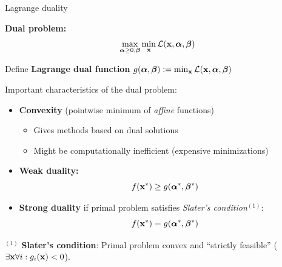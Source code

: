 \documentclass[11pt,compress,t,notes=noshow, xcolor=table]{beamer}
\begin{document}
\begin{vbframe}{Lagrange duality}

\textbf{Dual problem:}
\begin{equation*}
    \max_{\bm{\alpha} \ge 0, \bm{\beta}} \min_{\mathbf{x}}  \mathcal{L}(\mathbf{x}, \bm{\alpha}, \bm{\beta})
\end{equation*}

Define \textbf{Lagrange dual function} $g(\bm{\alpha}, \bm{\beta}) := \min_{\mathbf{x}}  \mathcal{L}(\mathbf{x}, \bm{\alpha}, \bm{\beta})$

\medskip

Important characteristics of the dual problem:

\begin{itemize}
    \item \textbf{Convexity} (pointwise minimum of \textit{affine} functions)
        \begin{itemize}
            \small
            \item Gives methods based on dual solutions
            \item Might be computationally inefficient (expensive minimizations)
        \end{itemize}
    \item \textbf{Weak duality:}
        \begin{equation*}
            f(\mathbf{x}^*) \geq g(\bm{\alpha}^*, \bm{\beta}^*)
        \end{equation*}
    \item \textbf{Strong duality} if primal problem satisfies \textit{Slater's condition}$^{(1)}$:
        \begin{equation*}
            f(\mathbf{x}^*) = g(\bm{\alpha}^*, \bm{\beta}^*)
        \end{equation*}
\end{itemize}

\vfill

\begin{footnotesize}
$^{(1)}$ \textbf{Slater's condition}: Primal problem convex and \enquote{strictly feasible} ($\exists \mathbf{x} \forall i: g_i(\mathbf{x}) < 0$).
\end{footnotesize}

\end{vbframe}



%
%
%
%
%
%
\end{document}
